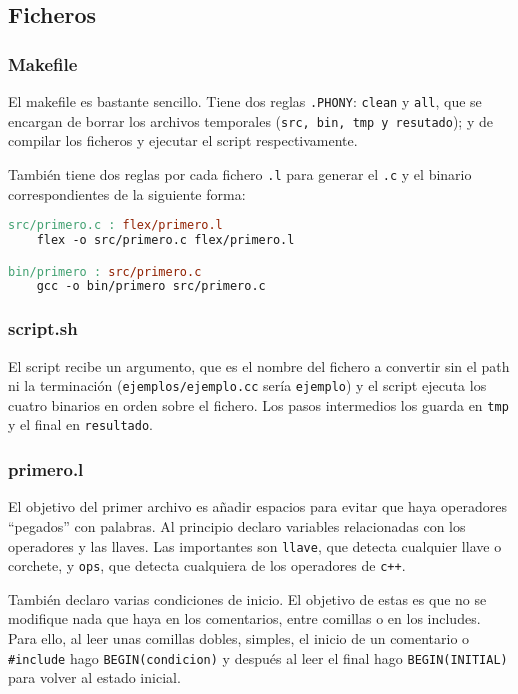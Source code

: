 \documentclass[10pt]{article}
\begin{document}
    \subsection{Ficheros}
    \subsubsection{Makefile}
    El makefile es bastante sencillo. Tiene dos reglas \texttt{.PHONY}: \texttt{clean} y \texttt{all}, que se encargan de borrar los archivos temporales (\texttt{src, bin, tmp y resutado}); y de compilar los ficheros y ejecutar el script respectivamente.

    También tiene dos reglas por cada fichero \texttt{.l} para generar el \texttt{.c} y el binario correspondientes de la siguiente forma:

    \begin{lstlisting}[language=make]
src/primero.c : flex/primero.l
    flex -o src/primero.c flex/primero.l

bin/primero : src/primero.c
    gcc -o bin/primero src/primero.c
    \end{lstlisting}

    \subsubsection{script.sh}

    El script recibe un argumento, que es el nombre del fichero a convertir sin el path ni la terminación (\texttt{ejemplos/ejemplo.cc} sería \texttt{ejemplo}) y el script ejecuta los cuatro binarios en orden sobre el fichero. Los pasos intermedios los guarda en \texttt{tmp} y el final en \texttt{resultado}.

    

    \subsubsection{primero.l}
    El objetivo del primer archivo es añadir espacios para evitar que haya operadores ``pegados'' con palabras. Al principio declaro variables relacionadas con los operadores y las llaves. Las importantes son \texttt{llave}, que detecta cualquier llave o corchete, y \texttt{ops}, que detecta cualquiera de los operadores de \texttt{c++}.

    También declaro varias condiciones de inicio. El objetivo de estas es que no se modifique nada que haya en los comentarios, entre comillas o en los includes. Para ello, al leer unas comillas dobles, simples, el inicio de un comentario o \verb|#include| hago \texttt{BEGIN(condicion)} y después al leer el final hago \texttt{BEGIN(INITIAL)} para volver al estado inicial.
\end{document}
